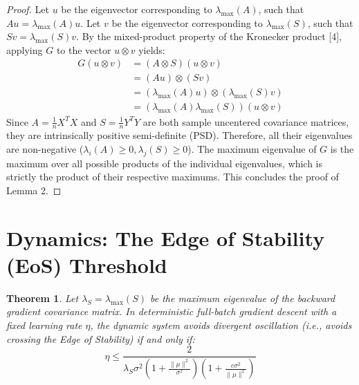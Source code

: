 \documentclass[11pt, a4paper]{article}
\newtheorem{theorem}{Theorem}
\begin{document}
\begin{proof}
Let $u$ be the eigenvector corresponding to $\lambda_{\max}(A)$, such that $A u = \lambda_{\max}(A) u$. 
Let $v$ be the eigenvector corresponding to $\lambda_{\max}(S)$, such that $S v = \lambda_{\max}(S) v$.
By the mixed-product property of the Kronecker product [4], applying $G$ to the vector $u \otimes v$ yields:
\begin{align}
    G (u \otimes v) &= (A \otimes S) (u \otimes v) \\
                    &= (A u) \otimes (S v) \\
                    &= (\lambda_{\max}(A) u) \otimes (\lambda_{\max}(S) v) \\
                    &= (\lambda_{\max}(A) \lambda_{\max}(S)) (u \otimes v)
\end{align}
Since $A = \frac{1}{n} X^T X$ and $S = \frac{1}{n} Y^T Y$ are both sample uncentered covariance matrices, they are intrinsically positive semi-definite (PSD). Therefore, all their eigenvalues are non-negative ($\lambda_i(A) \ge 0, \lambda_j(S) \ge 0$). The maximum eigenvalue of $G$ is the maximum over all possible products of the individual eigenvalues, which is strictly the product of their respective maximums. This concludes the proof of Lemma 2.
\end{proof}

\section{Dynamics: The Edge of Stability (EoS) Threshold}

\begin{theorem}
Let $\lambda_S = \lambda_{\max}(S)$ be the maximum eigenvalue of the backward gradient covariance matrix. In deterministic full-batch gradient descent with a fixed learning rate $\eta$, the dynamic system avoids divergent oscillation (i.e., avoids crossing the Edge of Stability) if and only if:
\begin{equation}
    \eta \le \frac{2}{\lambda_S \sigma^2 \left( 1 + \frac{\|\mu\|^2}{\sigma^2} \right) \left( 1 + \frac{c \sigma^2}{\|\mu\|^2} \right)}
\end{equation}
\end{theorem}
\end{document}
